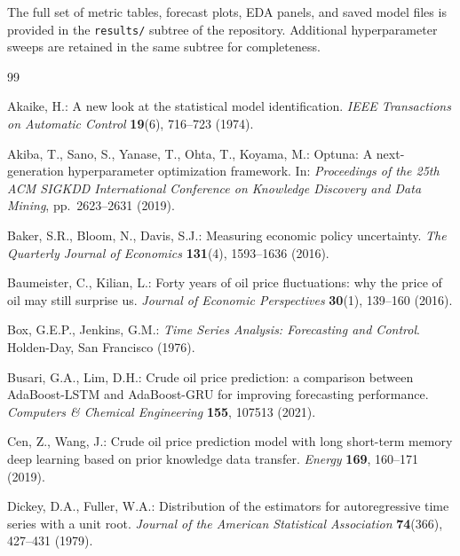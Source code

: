 \documentclass[12pt,a4paper]{article}
\begin{document}
The full set of metric tables, forecast plots, EDA panels, and saved model files is provided in the \texttt{results/} subtree of the repository. Additional hyperparameter sweeps are retained in the same subtree for completeness.

\newpage

\begin{thebibliography}{99}

Akaike, H.: A new look at the statistical model identification.
\emph{IEEE Transactions on Automatic Control} \textbf{19}(6), 716--723 (1974).

Akiba, T., Sano, S., Yanase, T., Ohta, T., Koyama, M.:
Optuna: A next-generation hyperparameter optimization framework.
In: \emph{Proceedings of the 25th ACM SIGKDD International Conference on Knowledge Discovery and Data Mining}, pp.\ 2623--2631 (2019).

Baker, S.R., Bloom, N., Davis, S.J.: Measuring economic policy uncertainty.
\emph{The Quarterly Journal of Economics} \textbf{131}(4), 1593--1636 (2016).

Baumeister, C., Kilian, L.: Forty years of oil price fluctuations: why the price of oil may still surprise us.
\emph{Journal of Economic Perspectives} \textbf{30}(1), 139--160 (2016).

Box, G.E.P., Jenkins, G.M.: \emph{Time Series Analysis: Forecasting and Control}. Holden-Day, San Francisco (1976).

Busari, G.A., Lim, D.H.: Crude oil price prediction: a comparison between AdaBoost-LSTM and AdaBoost-GRU for improving forecasting performance.
\emph{Computers \& Chemical Engineering} \textbf{155}, 107513 (2021).

Cen, Z., Wang, J.: Crude oil price prediction model with long short-term memory deep learning based on prior knowledge data transfer.
\emph{Energy} \textbf{169}, 160--171 (2019).

Dickey, D.A., Fuller, W.A.: Distribution of the estimators for autoregressive time series with a unit root.
\emph{Journal of the American Statistical Association} \textbf{74}(366), 427--431 (1979).


\end{thebibliography}
\end{document}
